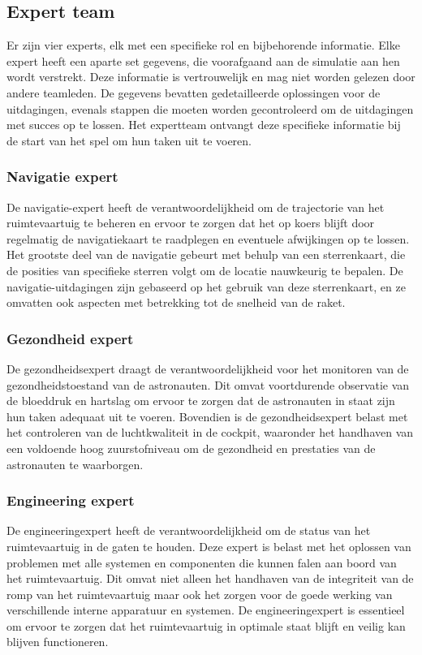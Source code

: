 \documentclass[
	a4paper, %
	10pt, %
	unnumberedsections, %
	twoside, %
]{LTJournalArticle}
\begin{document}
\subsection{Expert team}

Er zijn vier experts, elk met een specifieke rol en bijbehorende informatie. Elke expert heeft een aparte set gegevens, die voorafgaand aan de simulatie aan hen wordt verstrekt. Deze informatie is vertrouwelijk en mag niet worden gelezen door andere teamleden. De gegevens bevatten gedetailleerde oplossingen voor de uitdagingen, evenals stappen die moeten worden gecontroleerd om de uitdagingen met succes op te lossen. Het expertteam ontvangt deze specifieke informatie bij de start van het spel om hun taken uit te voeren.

\subsubsection{Navigatie expert}
De navigatie-expert heeft de verantwoordelijkheid om de trajectorie van het ruimtevaartuig te beheren en ervoor te zorgen dat het op koers blijft door regelmatig de navigatiekaart te raadplegen en eventuele afwijkingen op te lossen. Het grootste deel van de navigatie gebeurt met behulp van een sterrenkaart, die de posities van specifieke sterren volgt om de locatie nauwkeurig te bepalen. De navigatie-uitdagingen zijn gebaseerd op het gebruik van deze sterrenkaart, en ze omvatten ook aspecten met betrekking tot de snelheid van de raket.

\subsubsection{Gezondheid expert}
De gezondheidsexpert draagt de verantwoordelijkheid voor het monitoren van de gezondheidstoestand van de astronauten. Dit omvat voortdurende observatie van de bloeddruk en hartslag om ervoor te zorgen dat de astronauten in staat zijn hun taken adequaat uit te voeren. Bovendien is de gezondheidsexpert belast met het controleren van de luchtkwaliteit in de cockpit, waaronder het handhaven van een voldoende hoog zuurstofniveau om de gezondheid en prestaties van de astronauten te waarborgen.

\subsubsection{Engineering expert}
De engineeringexpert heeft de verantwoordelijkheid om de status van het ruimtevaartuig in de gaten te houden. Deze expert is belast met het oplossen van problemen met alle systemen en componenten die kunnen falen aan boord van het ruimtevaartuig. Dit omvat niet alleen het handhaven van de integriteit van de romp van het ruimtevaartuig maar ook het zorgen voor de goede werking van verschillende interne apparatuur en systemen. De engineeringexpert is essentieel om ervoor te zorgen dat het ruimtevaartuig in optimale staat blijft en veilig kan blijven functioneren.
\end{document}
